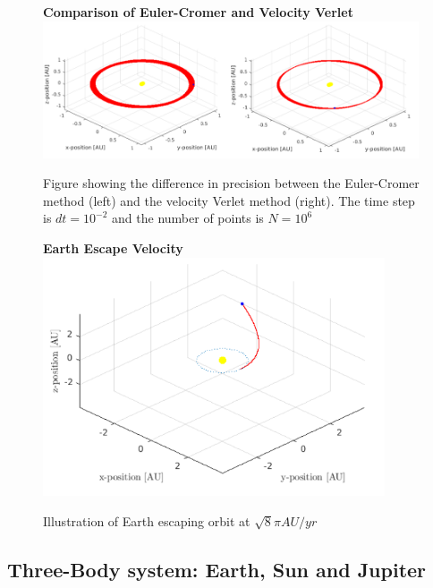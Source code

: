 \documentclass[10pt,a4paper]{amsart}
\begin{document}
\begin{figure}[ht]
	\centering
	\textbf{Comparison of Euler-Cromer and Velocity Verlet}
	\includegraphics[width=0.99\textwidth]{../figures/earthcompare.png}
	\label{fig:earthcompare}
	\caption{Figure showing the difference in precision between the Euler-Cromer method (left) and the velocity Verlet method (right). The time step is $dt=10^{-2}$ and the number of points is $N=10^6$}
\end{figure}

\begin{figure}[ht]
	\centering
	\textbf{Earth Escape Velocity}
	\includegraphics[width=0.9\textwidth]{../figures/earthescape.png}
	\caption{Illustration of Earth escaping orbit at $\sqrt{8}\pi AU/yr$}
\end{figure}


\subsection{Three-Body system: Earth, Sun and Jupiter}
\end{document}

